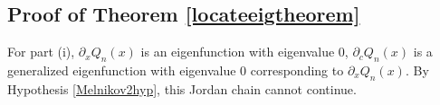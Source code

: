 \documentclass[thesis.tex]{subfiles}
\begin{document}
\subsection{Proof of Theorem \ref{locateeigtheorem}}

For part (i), $\partial_x Q_n(x)$ is an eigenfunction with eigenvalue 0, $\partial_c Q_n(x)$ is a generalized eigenfunction with eigenvalue 0 corresponding to $\partial_x Q_n(x)$. By Hypothesis \ref{Melnikov2hyp}, this Jordan chain cannot continue.

\iffulldocument\else
	
	
\fi
\end{document}
